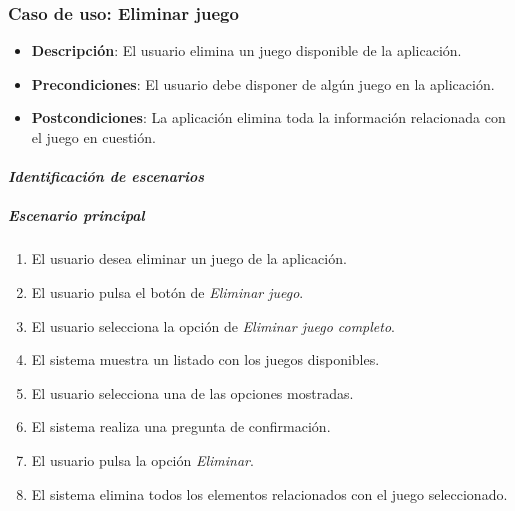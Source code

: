 \subsubsection{Caso de uso: Eliminar juego}
\begin{itemize}
    \item \textbf{Descripción}: El usuario elimina un juego disponible de la aplicación.
    \item \textbf{Precondiciones}: El usuario debe disponer de algún juego en la aplicación.
    \item \textbf{Postcondiciones}: La aplicación elimina toda la información relacionada 
    con el juego en cuestión.
\end{itemize}

\newpage
\paragraph{\textit{Identificación de escenarios}}
\subparagraph{Escenario principal}
\begin{enumerate}
    \item El usuario desea eliminar un juego de la aplicación.
    \item El usuario pulsa el botón de \textit{Eliminar juego}.
    \item El usuario selecciona la opción de \textit{Eliminar juego completo}.
    \item El sistema muestra un listado con los juegos disponibles.
    \item El usuario selecciona una de las opciones mostradas.
    \item El sistema realiza una pregunta de confirmación.
    \item El usuario pulsa la opción \textit{Eliminar}.
    \item El sistema elimina todos los elementos relacionados con el juego seleccionado.
\end{enumerate}


